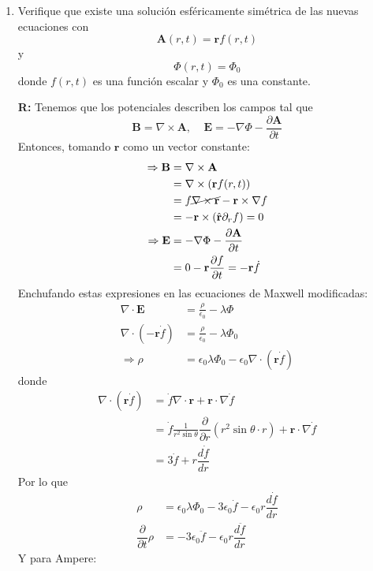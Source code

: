 \documentclass[]{article}
\numberwithin{equation}{section}
\newcommand{\0}{\textcolor{gray}{0}}
\newcommand{\gr}{\nabla}
\newcommand{\di}{\nabla\cdot}
\newcommand{\ro}{\nabla\times}
\newcommand{\rv}{\mathbf{r}}
\newcommand{\rhat}{\hat{\rv}}
\newcommand{\eo}{\epsilon_{0}}
\newcommand{\pd}[2]{\dfrac{\partial #1}{\partial #2}}
\newcommand{\td}[2]{\dfrac{d #1}{d #2}}
\newcommand{\n}[1]{\mathbf{#1}}
\begin{document}
\begin{enumerate}
\begin{enumerate}
		\item Verifique que existe una solución esféricamente simétrica de las nuevas ecuaciones con
		\begin{equation*}
			\n{A}(r,t) = \rv f(r,t)
		\end{equation*}
		y
		\begin{equation*}
			\Phi(r, t) = \Phi_0
		\end{equation*}
		donde \(f(r,t)\) es una función escalar y \(\Phi_0\) es una constante.
		
		\textbf{R:} Tenemos que los potenciales describen los campos tal que
		\begin{equation*}
			\n{B} = \ro\n{A}, ~~~~~ \n{E} = -\gr\Phi - \pd{\n{A}}{t}
		\end{equation*}
		Entonces, tomando \(\n{r}\) como un vector constante:
		\begin{align*}
			\Rightarrow \n{B} &= \ro\n{A}\\
			&= \ro(\rv f(r,t))\\
			&= f\cancel{\ro \rv} - \rv\times\gr f\\
			&= - \rv\times (\rhat \partial_r f) = 0\\
			\Rightarrow \n{E} &= -\gr\Phi - \pd{\n{A}}{t}\\
			&= 0 - \rv \pd{f}{t} = - \rv\dot{f}
		\end{align*}
		Enchufando estas expresiones en las ecuaciones de Maxwell modificadas:
		\begin{align*}
			\di\n{E} &= \frac{\rho}{\eo} - \lambda\Phi\\
			\di\left(- \rv\dot{f}\right) &= \frac{\rho}{\eo} - \lambda \Phi_0\\
			\Rightarrow \rho &= \eo \lambda \Phi_0 - \eo\di\left(\rv\dot{f}\right)
		\end{align*}
		donde
		\begin{align*}
			\di\left(\rv\dot{f}\right) &= \dot{f}\di\rv + \rv\cdot\gr\dot{f}\\
			&= \dot{f} \frac{1}{r^2 \sin\theta}\pd{}{r}\left(r^2\sin\theta \cdot r\right) + \rv\cdot\gr\dot{f}\\
			&= 3\dot{f} + r\td{\dot{f}}{r}
		\end{align*}
		Por lo que
		\begin{align*}
			\rho &= \eo \lambda \Phi_0 - 3\eo\dot{f} - \eo r\td{\dot{f}}{r}\\
			\pd{}{t}\rho &= - 3\eo\ddot{f} - \eo r\td{\ddot{f}}{r}
		\end{align*}
		Y para Ampere:
		\begin{align*}

\end{align*}
\end{enumerate}
\end{enumerate}
\end{document}
